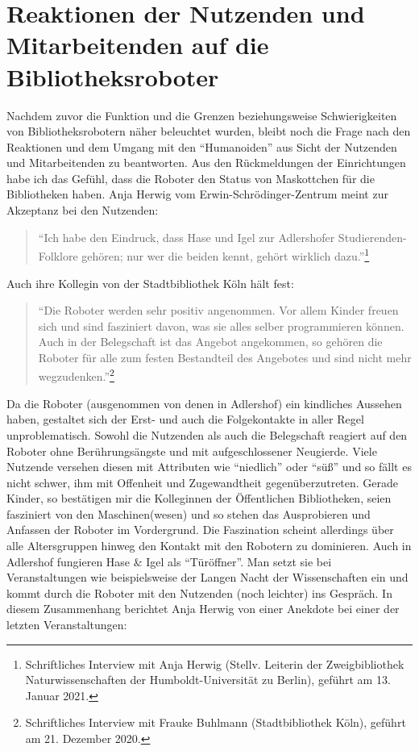 \documentclass[a4paper,
fontsize=11pt,
oneside,
numbers=noperiodatend,
parskip=half-,
bibliography=totoc,
final
]{scrartcl}
\begin{document}
\hypertarget{reaktionen-der-nutzenden-und-mitarbeitenden-auf-die-bibliotheksroboter}{%
\section{Reaktionen der Nutzenden und Mitarbeitenden auf die Bibliotheksroboter}\label{reaktionen-der-nutzenden-und-mitarbeitenden-auf-die-bibliotheksroboter}}

Nachdem zuvor die Funktion und die Grenzen beziehungsweise
Schwierigkeiten von Bibliotheksrobotern näher beleuchtet wurden, bleibt
noch die Frage nach den Reaktionen und dem Umgang mit den
\enquote{Humanoiden} aus Sicht der Nutzenden und Mitarbeitenden zu
beantworten. Aus den Rückmeldungen der Einrichtungen habe ich das
Gefühl, dass die Roboter den Status von Maskottchen für die Bibliotheken
haben. Anja Herwig vom Erwin-Schrödinger-Zentrum meint zur Akzeptanz bei
den Nutzenden: 

\begin{quote}
\enquote{Ich habe den Eindruck, dass Hase und Igel zur
Adlershofer Studierenden-Folklore gehören; nur wer die beiden kennt,
gehört wirklich dazu.}\footnote{Schriftliches Interview mit Anja Herwig
  (Stellv. Leiterin der Zweigbibliothek Naturwissenschaften der
  Humboldt-Universität zu Berlin), geführt am 13. Januar 2021.} 
 \end{quote} 
 
 Auch
ihre Kollegin von der Stadtbibliothek Köln hält fest: 

\begin{quote}
\enquote{Die
Roboter werden sehr positiv angenommen. Vor allem Kinder freuen sich und
sind fasziniert davon, was sie alles selber programmieren können. Auch
in der Belegschaft ist das Angebot angekommen, so gehören die Roboter
für alle zum festen Bestandteil des Angebotes und sind nicht mehr
wegzudenken.}\footnote{Schriftliches Interview mit Frauke Buhlmann
  (Stadtbibliothek Köln), geführt am 21. Dezember 2020.} 
 \end{quote} 
  
 Da die Roboter
(ausgenommen von denen in Adlershof) ein kindliches Aussehen haben,
gestaltet sich der Erst- und auch die Folgekontakte in aller Regel
unproblematisch. Sowohl die Nutzenden als auch die Belegschaft reagiert
auf den Roboter ohne Berührungsängste und mit aufgeschlossener
Neugierde. Viele Nutzende versehen diesen mit Attributen wie
\enquote{niedlich} oder \enquote{süß} und so fällt es nicht schwer, ihm
mit Offenheit und Zugewandtheit gegenüberzutreten. Gerade Kinder, so
bestätigen mir die Kolleginnen der Öffentlichen Bibliotheken, seien
fasziniert von den Maschinen(wesen) und so stehen das Ausprobieren und
Anfassen der Roboter im Vordergrund. Die Faszination scheint allerdings
über alle Altersgruppen hinweg den Kontakt mit den Robotern zu
dominieren. Auch in Adlershof fungieren Hase \& Igel als
\enquote{Türöffner}. Man setzt sie bei Veranstaltungen wie
beispielsweise der Langen Nacht der Wissenschaften ein und kommt durch
die Roboter mit den Nutzenden (noch leichter) ins Gespräch. In diesem
Zusammenhang berichtet Anja Herwig von einer Anekdote bei einer der
letzten Veranstaltungen: 
\end{document}
